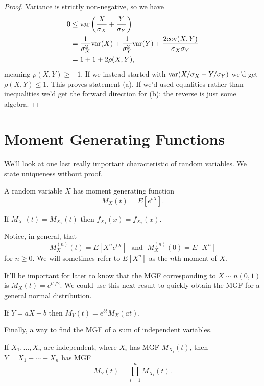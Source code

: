 \documentclass[../m157main.tex]{subfiles}
\begin{document}
\begin{proof}
    Variance is strictly non-negative, so we have
    \begin{align*}
        0 &\leq \textrm{var} \left( \frac{X}{\sigma_X} + \frac{Y}{\sigma_Y} \right) \\
        &= \frac{1}{\sigma_X^2} \textrm{var}(X) + \frac{1}{\sigma_Y^2} \textrm{var}(Y) + \frac{2 \textrm{cov}(X,Y)}{\sigma_X \sigma_Y} \\
        &= 1 + 1 + 2\rho(X,Y),
    \end{align*}
    meaning $\rho(X,Y) \geq -1$.
    If we instead started with $\textrm{var}(X / \sigma_X - Y / \sigma_Y)$ we'd get $\rho(X,Y) \leq 1$.
    This proves statement (a).
    If we'd used equalities rather than inequalities we'd get the forward direction for (b); the reverse is just some algebra.
\end{proof}

\section{Moment Generating Functions}
We'll look at one last really important characteristic of random variables.
We state uniqueness without proof.

\begin{definition}
    A random variable $X$ has moment generating function
    \[ M_X(t) = E [e^{tX}]. \]
\end{definition}

\begin{theorem}
    If $M_{X_1}(t) = M_{X_2}(t)$ then $f_{X_1}(x) = f_{X_2}(x)$.
\end{theorem}

Notice, in general, that
\[ M_X^{(n)}(t) = E[X^{n} e^{tX}] \;\text{ and }\; M_X^{(n)}(0) = E[X^{n}] \]
for $n \geq 0$.
We will sometimes refer to $E[X^n]$ as the $n$th moment of $X$.

It'll be important for later to know that the MGF corresponding to $X \sim n(0,1)$ is $M_X(t) = e^{t^2 / 2}$.
We could use this next result to quickly obtain the MGF for a general normal distribution.

\begin{theorem}[]
    If $Y = aX + b$ then $M_Y(t) = e^{bt} M_X(at)$.
\end{theorem}

Finally, a way to find the MGF of a sum of independent variables.

\begin{theorem}
    If $X_1, \ldots, X_n$ are independent, where $X_i$ has MGF $M_{X_i}(t)$, then $Y = X_1 + \cdots + X_n$ has MGF
    \[ M_Y(t) = \prod_{i=1}^{n} M_{X_i}(t). \]
\end{theorem}
\end{document}
